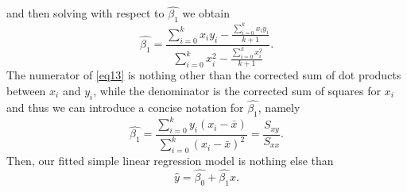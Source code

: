 \documentclass[10pt,a4paper, twocolumn, conference]{IEEEtran}
\begin{document}
and then solving with respect to $\hat{\beta_1}$ we obtain
\begin{equation}
\hat{\beta_1} = \frac{\sum_{i=0}^k x_i y_i - \frac{\sum_{i = 0}^k x_i y_i}{k + 1}}{\sum_{i=0}^k x_i^2 - \frac{\sum_{i=0}^k x_i^2}{k+1}}.
\end{equation}
The numerator of \cref{eq13} is nothing other than the corrected sum of dot products between $x_i$ and $y_i$, while the denominator is the corrected sum of squares for $x_i$ and thus we can introduce a concise notation for $\hat{\beta_1}$, namely
\begin{equation}
\hat{\beta_1} = \frac{\sum_{i=0}^k y_i (x_i - \bar{x})}{\sum_{i=0}^k (x_i - \bar{x})^2} = \frac{S_{xy}}{S_{xx}}.
\end{equation}
Then, our fitted simple linear regression model is nothing else than
\begin{equation}
\hat{y} = \hat{\beta_0} + \hat{\beta_1} x.
\end{equation}
\end{document}
